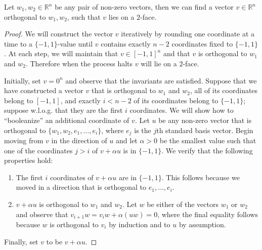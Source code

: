 \begin{lemma} \label{lem:orthogonal_vector}
Let $w_1, w_2 \in \mathbb{R}^n$ be any pair of non-zero vectors, then we can find a vector $v \in \mathbb{R}^n$ orthogonal to $w_1, w_2$, such that $v$ lies on a $2$-face.
\end{lemma}
\begin{proof}
	We will construct the vector $v$ iteratively by rounding one coordinate at a time to a $\{-1,1\}$-value until $v$ contains exactly $n-2$ coordinates fixed to $\{-1,1\}$. At each step, we will maintain that $v \in [-1,1]^n$ and that $v$ is orthogonal to $w_1$ and $w_2$. Therefore when the process halts $v$ will lie on a $2$-face.
	
	Initially, set $v = 0^n$ and observe that the invariants are satisfied. Suppose that we have constructed a vector $v$ that is orthogonal to $w_1$ and $w_2$, all of its coordinates belong to $[-1,1]$, and exactly $i < n-2$ of its coordinates belong to $\{-1,1\}$; suppose w.l.o.g. that they are the first $i$ coordinates. We will show how to ``booleanize'' an additional coordinate of $v$. Let $u$ be any non-zero vector that is orthogonal to $\{w_1, w_2, e_1, \ldots, e_i\}$, where $e_j$ is the $j$th standard basis vector. Begin moving from $v$ in the direction of $u$ and let $\alpha > 0$ be the smallest value such that one of the coordinates $j > i$ of $v + \alpha u$ is in $\{-1, 1\}$. %
	We verify that the following properties hold:
	\begin{enumerate}
		\item The first $i$ coordinates of $v + \alpha u$ are in $\{ -1, 1\}$. This follows because we moved in a direction that is orthogonal to $e_1, \ldots, e_i$. %
		\item $v + \alpha u$ is orthogonal to $w_1$ and $w_2$. Let $w$ be either of the vectors $w_1$ or $w_2$ and observe that  $v_{i+1}w = v_iw + \alpha (uw) = 0$,
		where the final equality follows because $w$ is orthogonal to $v_i$ by induction and to $u$ by assumption. 
	\end{enumerate}
	Finally, set $v$ to be  $v + \alpha u$. 
\end{proof}


